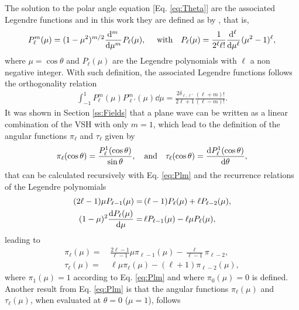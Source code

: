 The solution to the polar angle equation [Eq. \eqref{eq:Theta}] are the associated Legendre functions and in this work they are defined as by \citeauthor{arfken_mathematical_2001} \cite{arfken_mathematical_2001}, that is,
%
%
%
%
%
\begin{equation}
P_\ell^m(\mu) = (1-\mu^2)^{m/2}\dv[m]{\,}{\mu}\hspace*{.05em} P_\ell(\mu),
\qqtext{ with}
P_\ell(\mu) = \frac{1}{2^\ell \ell!}\dv[\ell]{\,}{\mu}\hspace*{.05em}  (\mu^2-1)^\ell ,
\label{eq:Plm}
\end{equation}
%
where $\mu = \cos\theta$ and $P_\ell(\mu)$ are the Legendre polynomials with $\ell$ a non negative integer. With such definition, the  associated Legendre functions follows the orthogonality relation
%
\begin{align}
\int_{-1}^1 P_\ell^m(\mu)P_{\ell'}^m(\mu)\dd{\mu} = \frac{2\delta_{\ell,\ell'}}{2\ell+1}\frac{(\ell+m)!}{(\ell-m)!}.
\label{eq:PlmOrtho}
\end{align}
%
It was shown in Section \ref{ss:Fields} that  a plane wave can be written as a linear combination of the VSH with only $m = 1$, which lead to the definition of the angular functions $\pi_\ell$ and $\tau_\ell$ given by
%
%
\begin{align*}
 \pi_\ell(\cos\theta )  = \frac{P_\ell^1(\cos\theta)}{\sin\theta},\qqtext{and}
 \tau_\ell(\cos\theta) = \dv{P_\ell^1(\cos\theta)}{\theta},
\end{align*}
%
that can be calculated recursively with Eq. \eqref{eq:Plm}  and the recurrence relations of the Legendre polynomials
%
\begin{align}
(2\ell-1)\mu P_{\ell-1}(\mu) =&\, (\ell-1) P_{\ell}(\mu) + \ell P_{\ell-2}(\mu),\\
(1-\mu)^2\dv{P_\ell(\mu)}{\mu} =&\, \ell P_{\ell-1}(\mu) - \ell\mu P_\ell(\mu),
\end{align}
%
leading to
%
\begin{align}
\pi_\ell(\mu) =&\, \frac{2\ell-1}{\ell-1}\mu \pi_{\ell-1}(\mu) - \frac{\ell}{\ell-1}\pi_{\ell-2},\\
\tau_ \ell (\mu) =&\, \ell\mu\pi_\ell(\mu) - (\ell+1)\pi_{\ell-2}(\mu),
\end{align}
%
where $\pi_1(\mu) = 1$ according to  Eq. \eqref{eq:Plm} and where $\pi_0(\mu)=0$ is defined. Another result from Eq. \eqref{eq:Plm} is that the angular functions $\pi_\ell(\mu)$ and $\tau_\ell(\mu)$, when evaluated at $\theta =0$ ($\mu = 1$),  follows
